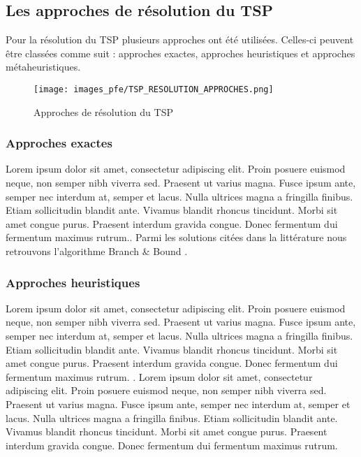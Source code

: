 \subsection{Les approches de résolution du TSP}

Pour la résolution du TSP plusieurs approches ont été utilisées. Celles-ci peuvent être classées comme suit : approches exactes, approches heuristiques et approches métaheuristiques.

\medskip

\begin{figure}[hbt!]
  \centering
  \texttt{[image: images\_pfe/TSP\_RESOLUTION\_APPROCHES.png]}
  \caption{Approches de résolution du TSP}
  \label{fig:tsp-solutions}
\end{figure}
\FloatBarrier

\medskip

\subsubsection{Approches exactes}
Lorem ipsum dolor sit amet, consectetur adipiscing elit. Proin posuere euismod neque, non semper nibh viverra sed. Praesent ut varius magna. Fusce ipsum ante, semper nec interdum at, semper et lacus. Nulla ultrices magna a fringilla finibus. Etiam sollicitudin blandit ante. Vivamus blandit rhoncus tincidunt. Morbi sit amet congue purus. Praesent interdum gravida congue. Donec fermentum dui fermentum maximus rutrum.. Parmi les solutions citées dans la littérature nous retrouvons l'algorithme Branch \& Bound \parencite{diderich_solving_1996,cotta_hybridizing_1995, tschoke_solving_1995}.

\medskip

\subsubsection{Approches heuristiques}
Lorem ipsum dolor sit amet, consectetur adipiscing elit. Proin posuere euismod neque, non semper nibh viverra sed. Praesent ut varius magna. Fusce ipsum ante, semper nec interdum at, semper et lacus. Nulla ultrices magna a fringilla finibus. Etiam sollicitudin blandit ante. Vivamus blandit rhoncus tincidunt. Morbi sit amet congue purus. Praesent interdum gravida congue. Donec fermentum dui fermentum maximus rutrum. \parencite{anbuudayasankar_survey_2014}.
Lorem ipsum dolor sit amet, consectetur adipiscing elit. Proin posuere euismod neque, non semper nibh viverra sed. Praesent ut varius magna. Fusce ipsum ante, semper nec interdum at, semper et lacus. Nulla ultrices magna a fringilla finibus. Etiam sollicitudin blandit ante. Vivamus blandit rhoncus tincidunt. Morbi sit amet congue purus. Praesent interdum gravida congue. Donec fermentum dui fermentum maximus rutrum.

